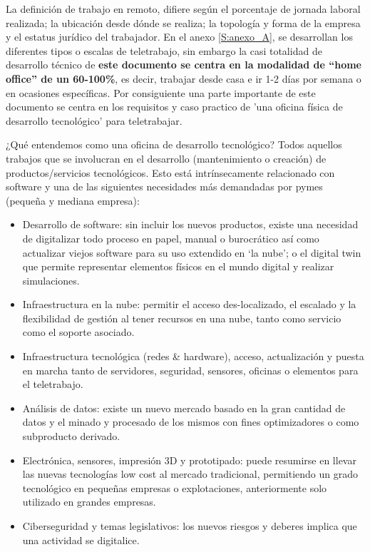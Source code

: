 La definición de trabajo en remoto, difiere según el porcentaje de jornada laboral realizada;  la ubicación desde dónde se realiza; la topología y forma de la empresa y el estatus jurídico del trabajador.  En el anexo \ref{S:anexo_A}, se desarrollan los diferentes tipos o escalas de teletrabajo, sin embargo la casi totalidad de desarrollo técnico de \textbf{este documento se centra en la modalidad de “home office” de un 60-100\%}, es decir, trabajar desde casa e ir 1-2 días por semana o en ocasiones específicas. Por consiguiente una parte importante de este documento se centra en los requisitos y caso practico de 'una oficina física de desarrollo tecnológico' para teletrabajar.

¿Qué entendemos como una oficina de desarrollo tecnológico? Todos aquellos trabajos que se involucran en el desarrollo (mantenimiento o creación)  de productos/servicios tecnológicos. Esto está intrínsecamente relacionado con software y una de las siguientes necesidades más demandadas por pymes (pequeña y mediana empresa):

\begin{itemize}
    \item Desarrollo de software: sin incluir los nuevos productos, existe una necesidad de digitalizar todo proceso en papel, manual o burocrático así como actualizar viejos software para su uso extendido en ‘la nube’; o el digital twin\cite{c_digital_twin} que permite representar elementos físicos en el mundo digital y realizar simulaciones. 

    \item Infraestructura en la nube:  permitir el acceso des-localizado, el escalado y la flexibilidad de gestión al tener recursos en una nube, tanto como servicio como el soporte asociado.
    
    \item Infraestructura tecnológica (redes \& hardware), acceso, actualización y puesta en marcha tanto de servidores, seguridad, sensores, oficinas o elementos para el teletrabajo.
    
    \item Análisis de datos: existe un nuevo mercado basado en la gran cantidad de datos y el minado y procesado de los mismos con fines optimizadores o como subproducto derivado.
    
    \item Electrónica, sensores, impresión 3D y prototipado: puede resumirse en llevar las nuevas tecnologías low cost al mercado tradicional, permitiendo un grado tecnológico en pequeñas empresas o explotaciones, anteriormente solo utilizado en grandes empresas.

    \item Ciberseguridad y temas legislativos: los nuevos riesgos y deberes implica que una actividad se digitalice.

\end{itemize}

